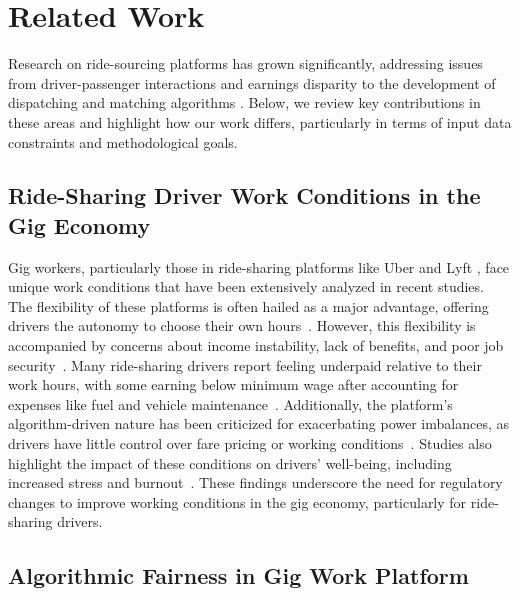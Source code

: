\section{Related Work}
Research on ride-sourcing platforms has grown significantly, addressing issues from driver-passenger interactions and earnings disparity to the development of dispatching and matching algorithms \cite{chen2019value, ruch2020quantifying, hall2018analysis}. 
Below, we review key contributions in these areas and highlight how our work differs, particularly in terms of input data constraints and methodological goals.

\subsection{Ride-Sharing Driver Work Conditions in the Gig Economy}

Gig workers, particularly those in ride-sharing platforms like Uber and Lyft \cite{barrios2022launching}, face unique work conditions that have been extensively analyzed in recent studies. The flexibility of these platforms is often hailed as a major advantage, offering drivers the autonomy to choose their own hours~\cite{tan2021ethical}. However, this flexibility is accompanied by concerns about income instability, lack of benefits, and poor job security~\cite{rosenblat2018uberland}. Many ride-sharing drivers report feeling underpaid relative to their work hours, with some earning below minimum wage after accounting for expenses like fuel and vehicle maintenance~\cite{bajwa2018health, brown2024driving, mishel2018uber}. Additionally, the platform's algorithm-driven nature has been criticized for exacerbating power imbalances, as drivers have little control over fare pricing or working conditions~\cite{lobel2017gig, zhu2024gig, kloostra2022algorithmic}. Studies also highlight the impact of these conditions on drivers' well-being, including increased stress and burnout~\cite{berger2019uber}. These findings underscore the need for regulatory changes to improve working conditions in the gig economy, particularly for ride-sharing drivers.

\subsection{Algorithmic Fairness in Gig Work Platform}

